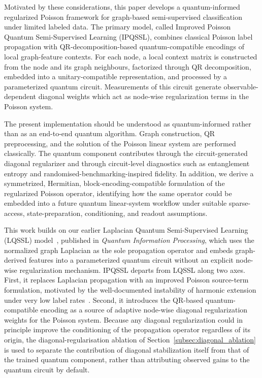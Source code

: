 \documentclass[11pt,a4paper]{article}
\begin{document}
Motivated by these considerations, this paper develops a quantum-informed regularized Poisson framework for graph-based semi-supervised classification under limited labeled data. The primary model, called Improved Poisson Quantum Semi-Supervised Learning (IPQSSL), combines classical Poisson label propagation with QR-decomposition-based quantum-compatible encodings of local graph-feature contexts. For each node, a local context matrix is constructed from the node and its graph neighbours, factorized through QR decomposition, embedded into a unitary-compatible representation, and processed by a parameterized quantum circuit. Measurements of this circuit generate observable-dependent diagonal weights which act as node-wise regularization terms in the Poisson system.

The present implementation should be understood as quantum-informed rather than as an end-to-end quantum algorithm. Graph construction, QR preprocessing, and the solution of the Poisson linear system are performed classically. The quantum component contributes through the circuit-generated diagonal regularizer and through circuit-level diagnostics such as entanglement entropy and randomised-benchmarking-inspired fidelity. In addition, we derive a symmetrized, Hermitian, block-encoding-compatible formulation of the regularized Poisson operator, identifying how the same operator could be embedded into a future quantum linear-system workflow under suitable sparse-access, state-preparation, conditioning, and readout assumptions.

This work builds on our earlier Laplacian Quantum Semi-Supervised Learning (LQSSL) model~\cite{gholipour2025laplacian}, published in \emph{Quantum Information Processing}, which uses the normalized graph Laplacian as the sole propagation operator and embeds graph-derived features into a parameterized quantum circuit without an explicit node-wise regularization mechanism. IPQSSL departs from LQSSL along two axes. First, it replaces Laplacian propagation with an improved Poisson source-term formulation, motivated by the well-documented instability of harmonic extension under very low label rates~\cite{calder2020poisson}. Second, it introduces the QR-based quantum-compatible encoding as a source of adaptive node-wise diagonal regularization weights for the Poisson system. Because any diagonal regularization could in principle improve the conditioning of the propagation operator regardless of its origin, the diagonal-regularisation ablation of Section~\ref{subsec:diagonal_ablation} is used to separate the contribution of diagonal stabilization itself from that of the trained quantum component, rather than attributing observed gains to the quantum circuit by default.
\end{document}
